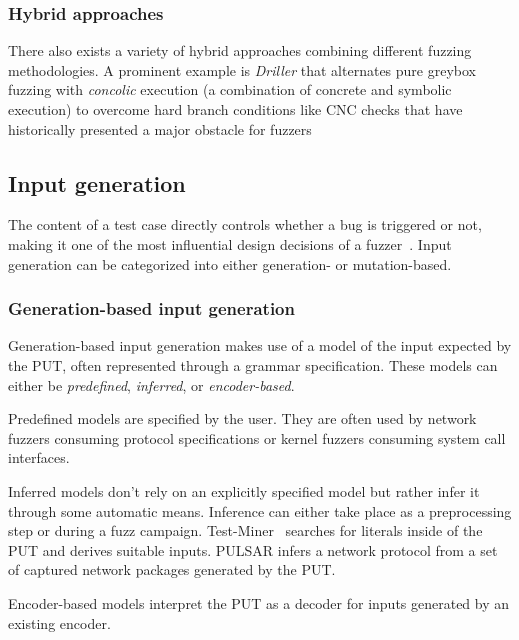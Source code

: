 \subsubsection{Hybrid approaches}

There also exists a variety of hybrid approaches combining different fuzzing methodologies.
A prominent example is \emph{Driller} that alternates pure greybox fuzzing with
\emph{concolic} execution (a combination of concrete and symbolic execution) to overcome hard branch
conditions like CNC checks that have historically presented a major obstacle for fuzzers~\cite{stephens_driller_2016}

\subsection{Input generation}\label{sec:fuzzing-input-generation}


The content of a test case directly controls whether a bug is triggered or not, making
it one of the most influential design decisions of a fuzzer~\cite{manes_art_2019}.
Input generation can be categorized into either generation- or mutation-based.

\subsubsection{Generation-based input generation}

Generation-based input generation makes use of a model of the input expected by
the PUT, often represented through a grammar specification.
These models can either be \emph{predefined}, \emph{inferred}, or \emph{encoder-based}.

Predefined models are specified by the user.
They are often used by network fuzzers consuming protocol specifications or kernel fuzzers
consuming system call interfaces.

Inferred models don't rely on an explicitly specified model but rather infer it through some automatic means.
Inference can either take place as a preprocessing step or during a fuzz campaign.
Test-Miner~\cite{TODO toffola17} searches for literals inside of the PUT and derives suitable inputs.
PULSAR\cite{TODO wressnegger15} infers a network protocol from a set of captured network packages generated by the PUT.

Encoder-based models interpret the PUT as a decoder for inputs generated by an existing encoder.

